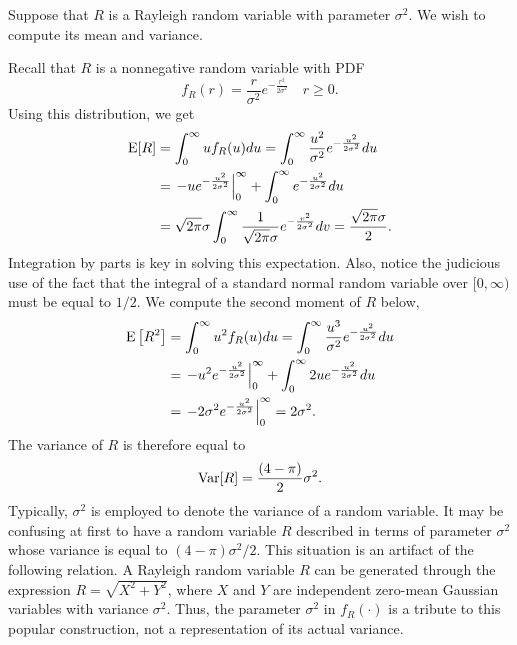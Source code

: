 \begin{example}
Suppose that $R$ is a Rayleigh random variable with parameter $\sigma^2$.
We wish to compute its mean and variance.

Recall that $R$ is a nonnegative random variable with PDF
\begin{equation*}
f_R (r) = \frac{r}{\sigma^2} e^{- \frac{r^2}{2 \sigma^2} } \quad r \geq 0 .
\end{equation*}
Using this distribution, we get
\begin{equation*}
\begin{split}
\mathrm{E} [R] &= \int_0^{\infty} u f_R(u) du
= \int_0^{\infty} \frac{u^2}{\sigma^2} e^{- \frac{u^2}{2 \sigma^2}} du \\
&= \left. - u e^{- \frac{u^2}{2 \sigma^2}} \right|_0^{\infty}
+ \int_0^{\infty} e^{- \frac{u^2}{2 \sigma^2}} du \\
&= \sqrt{ 2 \pi } \sigma
\int_0^{\infty} \frac{1}{\sqrt{2 \pi} \sigma} e^{- \frac{v^2}{2 \sigma^2}} dv
= \frac{\sqrt{2 \pi} \sigma}{2} .
\end{split}
\end{equation*}
Integration by parts is key in solving this expectation.
Also, notice the judicious use of the fact that the integral of a standard normal random variable over $[0, \infty)$ must be equal to $1/2$.
We compute the second moment of $R$ below,
\begin{equation*}
\begin{split}
\mathrm{E} \left[ R^2 \right] &= \int_0^{\infty} u^2 f_R(u) du
= \int_0^{\infty} \frac{u^3}{\sigma^2} e^{- \frac{u^2}{2 \sigma^2}} du \\
&= \left. - u^2 e^{- \frac{u^2}{2 \sigma^2}} \right|_0^{\infty}
+ \int_0^{\infty} 2 u e^{- \frac{u^2}{2 \sigma^2}} du \\
&= \left. - 2 \sigma^2 e^{- \frac{u^2}{2 \sigma^2}} \right|_0^{\infty}
= 2 \sigma^2 .
\end{split}
\end{equation*}
The variance of $R$ is therefore equal to
\begin{equation*}
\mathrm{Var} [R] = \frac{(4 - \pi)}{2} \sigma^2 .
\end{equation*}
Typically, $\sigma^2$ is employed to denote the variance of a random variable.
It may be confusing at first to have a random variable $R$ described in terms of parameter $\sigma^2$ whose variance is equal to $(4 - \pi) \sigma^2/2$.
This situation is an artifact of the following relation.
A Rayleigh random variable $R$ can be generated through the expression $R = \sqrt{X^2 + Y^2}$, where $X$ and $Y$ are independent zero-mean Gaussian variables with variance $\sigma^2$.
Thus, the parameter $\sigma^2$ in $f_R (\cdot)$ is a tribute to this popular construction, not a representation of its actual variance.
\end{example}

